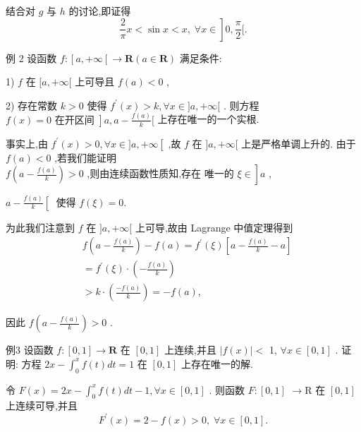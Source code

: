 结合对 $g$ 与 $h$ 的讨论,即证得
$$\left. {\frac{2}{\pi }x < \sin x < x,\;\forall x \in  }\right\rbrack  0,\frac{\pi }{2}\lbrack .$$

例 2 设函数 $f : \left\lbrack  {a, + \infty \left\lbrack  { \rightarrow  \mathbf{R}\left( {a \in  \mathbf{R}}\right) }\right. }\right.$ 满足条件:

1) $f$ 在 $\lbrack a, + \infty \lbrack$ 上可导且 $f\left( a\right)  < 0$ ,

2) 存在常数 $k > 0$ 使得 ${f}^{\prime }\left( x\right)  > k,\forall x \in  \rbrack a, + \infty \lbrack$ . 则方程 $\left. {f\left( x\right)  = 0\text{ 在开区间 }}\right\rbrack  a,a - \frac{f\left( a\right) }{k}\lbrack$ 上存在唯一的一个实根.

事实上,由 ${f}^{\prime }\left( x\right)  > 0,\forall x \in  \rbrack a, + \infty \left\lbrack  {\text{ ,故 }f}\right.$ 在 $\rbrack a, + \infty \lbrack$ 上是严格单调上升的. 由于 $f\left( a\right)  < 0$ ,若我们能证明 $\left. {f\left( {a - \frac{f\left( a\right) }{k}}\right)  > 0\text{ ,则由连续函数性质知,存在 唯一的 }\xi  \in  }\right\rbrack  a$ ,

$a - \frac{f\left( a\right) }{k}\left\lbrack  {\;\text{ 使得 }f\left( \xi \right)  = 0.}\right.$

为此我们注意到 $f$ 在 $\rbrack a, + \infty \lbrack$ 上可导,故由 Lagrange 中值定理得到
\begin{align*}
	&f\left( {a - \frac{f\left( a\right) }{k}}\right)  - f\left( a\right)  = {f}^{\prime }\left( \xi \right) \left\lbrack  {a - \frac{f\left( a\right) }{k} - a}\right\rbrack\\
	&= {f}^{\prime }\left( \xi \right)  \cdot  \left( {-\frac{f\left( a\right) }{k}}\right)\\
	&> k \cdot  \left( \frac{-f\left( a\right) }{k}\right)  =  - f\left( a\right) ,
\end{align*}

因此 $f\left( {a - \frac{f\left( a\right) }{k}}\right)  > 0$ .

例3 设函数 $f : \left\lbrack  {0,1}\right\rbrack   \rightarrow  \mathbf{R}$ 在 $\left\lbrack  {0,1}\right\rbrack$ 上连续,并且 $\left| {f\left( x\right) }\right|  <$ 1, $\forall x \in  \left\lbrack  {0,1}\right\rbrack$ . 证明: 方程 ${2x} - {\int }_{0}^{x}f\left( t\right) {dt} = 1$ 在 $\left\lbrack  {0,1}\right\rbrack$ 上存在唯一的解.

令 $F\left( x\right)  = {2x} - {\int }_{0}^{x}f\left( t\right) {dt} - 1,\forall x \in  \left\lbrack  {0,1}\right\rbrack$ . 则函数 $F : \left\lbrack  {0,1}\right\rbrack$  $\rightarrow  \mathrm{R}$ 在 $\left\lbrack  {0,1}\right\rbrack$ 上连续可导,并且
$${F}^{\prime }\left( x\right)  = 2 - f\left( x\right)  > 0,\;\forall x \in  \left\lbrack  {0,1}\right\rbrack  .$$


